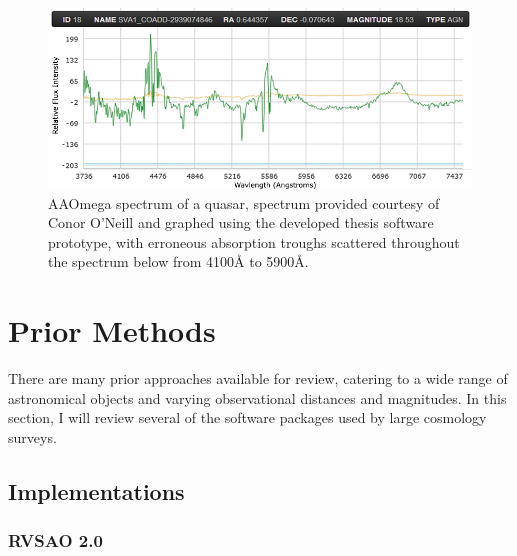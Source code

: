 \documentclass[titlesmallcaps, examinerscopy, copyrightpage]{uqthesis}
\begin{document}
\begin{figure}[ht!]
\includegraphics[width=1\textwidth]{images/dust.PNG} 
\centering
\caption{AAOmega spectrum of a quasar, spectrum provided courtesy of Conor O'Neill and graphed using the developed thesis software prototype, with erroneous absorption troughs scattered throughout the spectrum below from 4100{\AA} to 5900{\AA}.}
\label{fig:dust}
\end{figure}































\chapter{Prior Methods}
\label{ch:prior}

There are many prior approaches available for review, catering to a wide range of astronomical objects and varying observational distances and magnitudes. In this section, I will review several of the software packages used by large cosmology surveys.

\section{Implementations}

\subsection{RVSAO 2.0}
\end{document}
